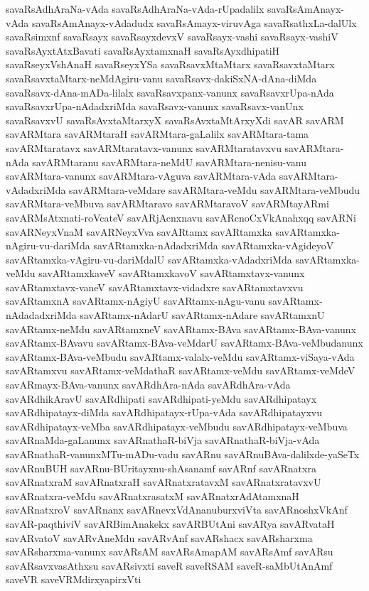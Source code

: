 {savaRsAdhAraNa-vAda
savaRsAdhAraNa-vAda-rUpadalilx
savaRsAmAnayx-vAda
savaRsAmAnayx-vAdadudx
savaRsAmayx-viruvAga
savaRsathxLa-dalUlx
savaRsimxnf
savaRsayx
savaRsayxdevxV
savaRsayx-vashi
savaRsayx-vashiV
savaRsAyxtAtxBavati
savaRsAyxtamxnaH
savaRsAyxdhipatiH
savaRseyxVshAnaH
savaRseyxYSa
savaRsavxMtaMtarx
savaRsavxtaMtarx
savaRsavxtaMtarx-neMdAgiru-vanu
savaRsavx-dakiSxNA-dAna-diMda
savaRsavx-dAna-mADa-lilalx
savaRsavxpanx-vanunx
savaRsavxrUpa-nAda
savaRsavxrUpa-nAdadxriMda
savaRsavx-vanunx
savaRsavx-vanUnx
savaRsavxvU
savaRsAvxtaMtarxyX
savaRsAvxtaMtArxyXdi
savAR
savARM
savARMtara
savARMtaraH
savARMtara-gaLalilx
savARMtara-tama
savARMtaratavx
savARMtaratavx-vanunx
savARMtaratavxvu
savARMtara-nAda
savARMtaranu
savARMtara-neMdU
savARMtara-nenisu-vanu
savARMtara-vanunx
savARMtara-vAguva
savARMtara-vAda
savARMtara-vAdadxriMda
savARMtara-veMdare
savARMtara-veMdu
savARMtara-veMbudu
savARMtara-veMbuva
savARMtaravo
savARMtaravoV
savARMtayARmi
savARMsAtxnati-roVcateV
savARjAcnxnavu
savARcnoCxVkAnahxqq
savARNi
savARNeyxVnaM
savARNeyxVva
savARtamx
savARtamxka
savARtamxka-nAgiru-vu-dariMda
savARtamxka-nAdadxriMda
savARtamxka-vAgideyoV
savARtamxka-vAgiru-vu-dariMdalU
savARtamxka-vAdadxriMda
savARtamxka-veMdu
savARtamxkaveV
savARtamxkavoV
savARtamxtavx-vanunx
savARtamxtavx-vaneV
savARtamxtavx-vidadxre
savARtamxtavxvu
savARtamxnA
savARtamx-nAgiyU
savARtamx-nAgu-vanu
savARtamx-nAdadadxriMda
savARtamx-nAdarU
savARtamx-nAdare
savARtamxnU
savARtamx-neMdu
savARtamxneV
savARtamx-BAva
savARtamx-BAva-vanunx
savARtamx-BAvavu
savARtamx-BAva-veMdarU
savARtamx-BAva-veMbudanunx
savARtamx-BAva-veMbudu
savARtamx-valalx-veMdu
savARtamx-viSaya-vAda
savARtamxvu
savARtamx-veMdathaR
savARtamx-veMdu
savARtamx-veMdeV
savARmayx-BAva-vanunx
savARdhAra-nAda
savARdhAra-vAda
savARdhikAravU
savARdhipati
savARdhipati-yeMdu
savARdhipatayx
savARdhipatayx-diMda
savARdhipatayx-rUpa-vAda
savARdhipatayxvu
savARdhipatayx-veMba
savARdhipatayx-veMbudu
savARdhipatayx-veMbuva
savARnaMda-gaLanunx
savARnathaR-biVja
savARnathaR-biVja-vAda
savARnathaR-vanunxMTu-mADu-vadu
savARnu
savARnuBAva-dalilxde-yaSeTx
savARnuBUH
savARnu-BUritayxnu-shAsanamf
savARnf
savARnatxra
savARnatxraM
savARnatxraH
savARnatxratavxM
savARnatxratavxvU
savARnatxra-veMdu
savARnatxrasatxM
savARnatxrAdAtamxnaH
savARnatxroV
savARnanx
savARnevxVdAnanuburxviVta
savARnoshxVkAnf
savAR-paqthiviV
savARBimAnakekx
savARBUtAni
savARya
savARvataH
savARvatoV
savARvAneMdu
savARvAnf
savARshacx
savARsharxma
savARsharxma-vanunx
savARsAM
savARsAmapAM
savARsAmf
savARsu
savARsavxvasAthxsu
savARsivxti
saveR
saveRSAM
saveR-saMbUtAnAmf
saveVR
saveVRMdirxyapirxVti
}
